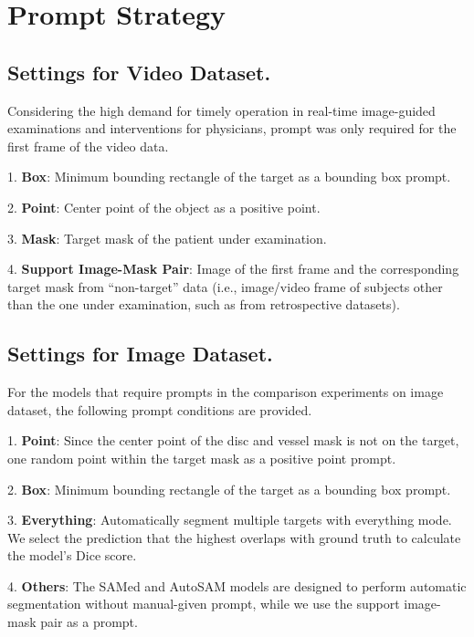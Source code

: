 \section{Prompt Strategy}
\label{sec:prompt strategy}
\subsection{Settings for Video Dataset.}
Considering the high demand for timely operation in real-time image-guided examinations and interventions for physicians, prompt was only required for the first frame of the video data. 

1. {\bf Box}: Minimum bounding rectangle of the target as a bounding box prompt. 

2. {\bf Point}: Center point of the object as a positive point. 

3. {\bf Mask}: Target mask of the patient under examination.

4. {\bf Support Image-Mask Pair}: Image of the first frame and the corresponding target mask from ``non-target'' data (i.e., image/video frame of subjects other than the one under examination, such as from retrospective datasets).

\subsection{Settings for Image Dataset.} 
For the models that require prompts in the comparison experiments on image dataset, the following prompt conditions are provided.

1. {\bf Point}: Since the center point of the disc and vessel mask is not on the target, one random point within the target mask as a positive point prompt. 

2. {\bf Box}: Minimum bounding rectangle of the target as a bounding box prompt. 

3. {\bf Everything}: Automatically segment multiple targets with everything mode. We select the prediction that the highest overlaps with ground truth to calculate the model's Dice score. 

4. {\bf Others}: The SAMed and AutoSAM models are designed to perform automatic segmentation without manual-given prompt, while we use the support image-mask pair as a prompt.

